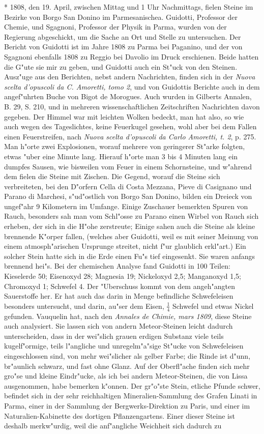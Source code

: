 \documentclass[a4paper, 11pt, oneside, polutonikogreek, german]{article}
\begin{document}
* 1808, den 19. April, zwischen Mittag und 1 Uhr Nachmittags, fielen Steine im Bezirke von Borgo San Donino im Parmesanischea. Guidotti, Professor der Chemie, und Sgagnoni, Professor der Physik in Parma, wurden von der Regierung abgeschickt, um die Sache an Ort und Stelle zu untersuchen. Der Bericht von Guidotti ist im Jahre 1808 zu Parma bei Paganino, und der von Sgagnoni ebenfalls 1808 zu Reggio bei Davolio im Druck erschienen. Beide hatten die G"ute sie mir zu geben, und Guidotti auch ein St"uck von den Steinen. Ausz"uge aus den Berichten, nebst andern Nachrichten, finden sich in der \emph{Nuova scelta d'opuscoli da C. Amoretti, tomo 2}, und von Guidottis Berichte auch in dem angef"uhrten Buche von Bigot de Morogues. Auch wurden in Gilberts Annalen, B. 29, S. 210, und in mehreren wissenschaftlichen Zeitschriften Nachrichten davon gegeben. Der Himmel war mit leichten Wolken bedeckt, man hat also, so wie auch wegen des Tageslichtes, keine Feuerkugel gesehen, wohl aber bei dem Fallen einen Feuerstreifen, nach \emph{Nuova scelta d'opuscoli da Carlo Amoretti, t. 2}, p. 275. Man h"orte zwei Explosionen, worauf mehrere von geringerer St"arke folgten, etwas "uber eine Minute lang. Hierauf h"orte man 3 bis 4 Minuten lang ein dumpfes Sausen, wie bisweilen vom Feuer in einem Schornsteine, und w"ahrend dem fielen die Steine mit Zischen. Die Gegend, worauf die Steine sich verbreiteten, bei den D"orfern Cella di Costa Mezzana, Pieve di Casignano und Parano di Marchesi, s"ud"ostlich von Borgo San Donino, bilden ein Dreieck von ungef"ahr 9 Kilometern im Umfange. Einige Zuschauer bemerkten Spuren von Rauch, besonders sah man vom Schl"osse zu Parano einen Wirbel von Rauch sich erheben, der sich in die H"ohe zerstreute; Einige sahen auch die Steine als kleine brennende K"orper fallen, (welches aber Guidotti, weil es mit seiner Meinung von einem atmosph"arischen Ursprunge streitet, nicht f"ur glaublich erkl"art.) Ein solcher Stein hatte sich in die Erde einen Fu"s tief eingesenkt. Sie waren anfangs brennend hei"s. Bei der chemischen Analyse fand Guidotti in 100 Teilen: Kieselerde 50; Eisenoxyd 28; Magnesia 19; Nickeloxyd 2,5; Manganoxyd 1,5; Chromoxyd 1; Schwefel 4. Der "Uberschuss kommt von dem angeh"angten Sauerstoffe her. Er hat auch das darin in Menge befindliche Schwefeleisen besonders untersucht, und darin, au"ser dem Eisen, $\mathfrak{\frac{1}{4}}$ Schwefel und etwas Nickel gefunden. Vauquelin hat, nach den \emph{Annales de Chimie, mars 1809}, diese Steine auch analysiert. Sie lassen sich von andern Meteor-Steinen leicht dadurch unterscheiden, dass in der wei"slich grauen erdigen Substanz viele teils kugelf"ormige, teils l"angliche und unregelm"a"sige St"ucke von Schwefeleisen eingeschlossen sind, von mehr wei"slicher als gelber Farbe; die Rinde ist d"unn, br"aunlich schwarz, und fast ohne Glanz. Auf der Oberfl"ache finden sich mehr gro"se und kleine Eindr"ucke, als ich bei andern Meteor-Steinen, die von Lissa ausgenommen, habe bemerken k"onnen. Der gr"o"ste Stein, etliche Pfunde schwer, befindet sich in der sehr reichhaltigen Mineralien-Sammlung des Grafen Linati in Parma, einer in der Sammlung der Bergwerks-Direktion zu Paris, und einer im Naturalien-Kabinette des dortigen Pflanzengartens. Einer dieser Steine ist deshalb merkw"urdig, weil die anf"angliche Weichheit sich dadurch zu 
\end{document}
